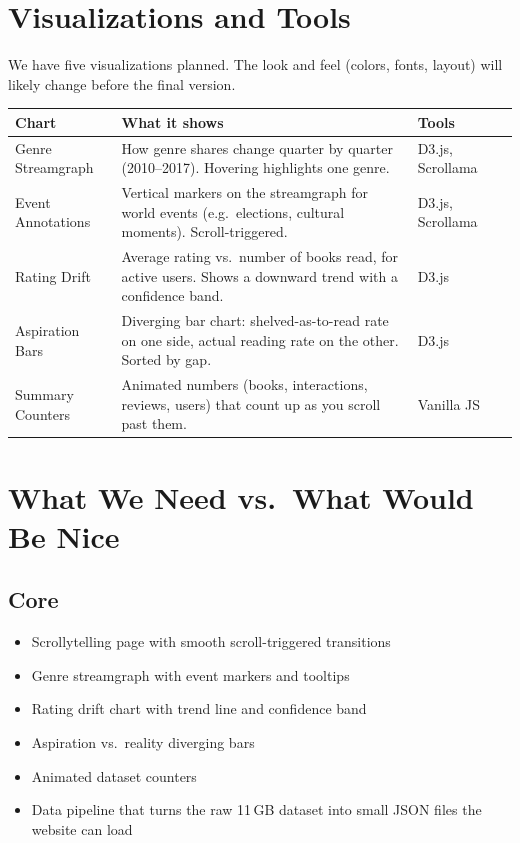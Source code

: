 \documentclass[11pt,a4paper]{article}
\begin{document}
\section{Visualizations and Tools}

We have five visualizations planned. The look and feel (colors, fonts, layout) will likely change before the final version.

\begin{table}[h!]
\centering\small
\begin{tabular}{@{}p{} p{} p{} p{}@{}}
\toprule
\textbf{Chart} & \textbf{What it shows} & \textbf{Tools} \\
\midrule
Genre Streamgraph &
  How genre shares change quarter by quarter (2010--2017). Hovering highlights one genre. &
  D3.js, Scrollama  \\[3pt]
Event Annotations &
  Vertical markers on the streamgraph for world events (e.g.\ elections, cultural moments). Scroll-triggered. &
  D3.js, Scrollama  \\[3pt]
Rating Drift &
  Average rating vs.\ number of books read, for active users. Shows a downward trend with a confidence band. &
  D3.js \\[3pt]
Aspiration Bars &
  Diverging bar chart: shelved-as-to-read rate on one side, actual reading rate on the other. Sorted by gap. &
  D3.js  \\[3pt]
Summary Counters &
  Animated numbers (books, interactions, reviews, users) that count up as you scroll past them. &
  Vanilla JS  \\
\bottomrule
\end{tabular}
\end{table}

\section{What We Need vs.\ What Would Be Nice}

\subsection{Core}
\begin{itemize}[leftmargin=1.5em, itemsep=1pt]
  \item Scrollytelling page with smooth scroll-triggered transitions
  \item Genre streamgraph with event markers and tooltips
  \item Rating drift chart with trend line and confidence band
  \item Aspiration vs.\ reality diverging bars
  \item Animated dataset counters
  \item Data pipeline that turns the raw 11\,GB dataset into small JSON files the website can load
\end{itemize}
\end{document}
